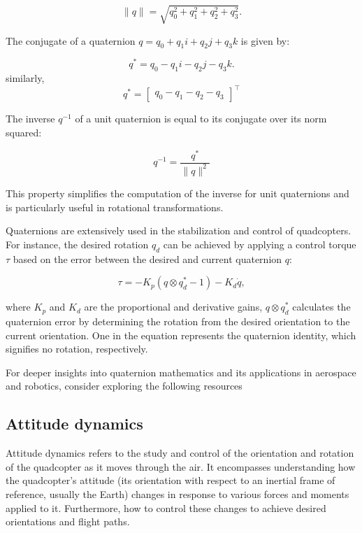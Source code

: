 \documentclass{report}
\begin{document}
\begin{equation}
\|q\| = \sqrt{q_0^2 + q_1^2 + q_2^2 + q_3^2}.
\end{equation}

The conjugate of a quaternion \( q = q_0 + q_1i + q_2j + q_3k \) is given by:

\begin{equation}
q^* = q_0 - q_1i - q_2j - q_3k.
\end{equation}
similarly,
\begin{equation}
q^* = \begin{bmatrix} q_0 - q_1 - q_2 - q_3\end{bmatrix}^\intercal
\end{equation}

The inverse \( q^{-1} \) of a unit quaternion is equal to its conjugate over its
norm squared:

\begin{equation}
q^{-1} = \frac{q^*}{\|q\| ^2}
\end{equation}

This property simplifies the computation of the inverse for unit quaternions and
is particularly useful in rotational transformations.

Quaternions are extensively used in the stabilization and control of
quadcopters. For instance, the desired rotation \( q_d \) can be achieved by
applying a control torque \( \tau \) based on the error between the desired and
current quaternion \( q \):

\begin{equation}
  \tau = -K_p (q \otimes q_d^* - 1) - K_d \dot{q},
\end{equation}

\noindent
where \( K_p \) and \( K_d \) are the proportional and derivative gains, \(q \otimes q_d^*\) calculates the quaternion error by determining the rotation from the desired orientation to the current orientation. One in the equation represents the quaternion identity, which signifies no rotation, respectively.

For deeper insights into quaternion mathematics and its applications in
aerospace and robotics, consider exploring the following resources
\cite{Kuipers1999} \cite{quaternion_curves}
\cite{QuaternionBasedAttitudeControl}

\subsection{Attitude dynamics}
Attitude dynamics refers to the study and control of the orientation and
rotation of the quadcopter as it moves through the air. It encompasses
understanding how the quadcopter's attitude (its orientation with respect to an
inertial frame of reference, usually the Earth) changes in response to various
forces and moments applied to it. Furthermore, how to control these changes to
achieve desired orientations and flight paths.
\end{document}
